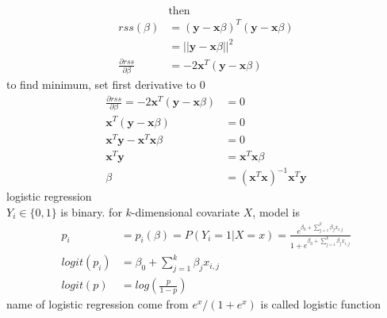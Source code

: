 \documentclass{article}
\begin{document}
\begin{align*}
&\text{then}\\
rss(\beta) &= (\textbf{y} - \textbf{x}\beta) ^ T (\textbf{y} - \textbf{x}\beta)\\
&= ||\textbf{y} - \textbf{x}\beta|| ^ 2\\
\frac{\partial rss}{\partial \beta} &= -2\textbf{x} ^ T(\textbf{y} - \textbf{x}\beta)
\end{align*}
to find minimum, set first derivative to 0
\begin{align*}
\frac{\partial rss}{\partial \beta} = -2\textbf{x} ^ T(\textbf{y} - \textbf{x}\beta) &= 0\\
\textbf{x} ^ T(\textbf{y} - \textbf{x}\beta) &= 0\\
\textbf{x} ^ T \textbf{y} - \textbf{x} ^ T \textbf{x}\beta &= 0\\
\textbf{x} ^ T \textbf{y} &= \textbf{x} ^ T \textbf{x}\beta\\
\beta &= (\textbf{x} ^ T \textbf{x}) ^ {-1} \textbf{x} ^ T \textbf{y}
\end{align*}
logistic regression\\
$Y_i \in \{0, 1\}$ is binary. for $k$-dimensional covariate $X$, model is
\begin{align*}
p_i &= p_i(\beta) = P(Y_i = 1|X = x) = \frac{e ^ {\beta_0 + \sum_{j = 1} ^ k \beta_j x_{i, j}}}{1 + e ^ {\beta_0 + \sum_{j = 1} ^ k \beta_j x_{i, j}}}\\
logit(p_i) &= \beta_0 + \sum_{j = 1} ^ k \beta_j x_{i, j}\\
logit(p) &= log\left(\frac{p}{1 - p}\right)
\end{align*}
name of logistic regression come from $e ^ x / (1 + e ^ x)$ is called logistic function
\end{document}
